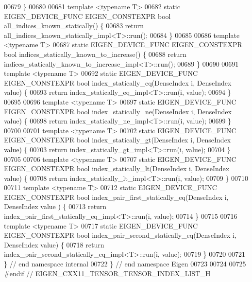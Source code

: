 \begin{DoxyCode}
00679 \}
00680 
00681 \textcolor{keyword}{template} <\textcolor{keyword}{typename} T>
00682 \textcolor{keyword}{static} EIGEN\_DEVICE\_FUNC EIGEN\_CONSTEXPR \textcolor{keywordtype}{bool} all\_indices\_known\_statically() \{
00683   \textcolor{keywordflow}{return} all\_indices\_known\_statically\_impl<T>::run();
00684 \}
00685 
00686 \textcolor{keyword}{template} <\textcolor{keyword}{typename} T>
00687 \textcolor{keyword}{static} EIGEN\_DEVICE\_FUNC EIGEN\_CONSTEXPR \textcolor{keywordtype}{bool} indices\_statically\_known\_to\_increase() \{
00688   \textcolor{keywordflow}{return} indices\_statically\_known\_to\_increase\_impl<T>::run();
00689 \}
00690 
00691 \textcolor{keyword}{template} <\textcolor{keyword}{typename} T>
00692 \textcolor{keyword}{static} EIGEN\_DEVICE\_FUNC EIGEN\_CONSTEXPR \textcolor{keywordtype}{bool} index\_statically\_eq(DenseIndex i, DenseIndex value) \{
00693   \textcolor{keywordflow}{return} index\_statically\_eq\_impl<T>::run(i, value);
00694 \}
00695 
00696 \textcolor{keyword}{template} <\textcolor{keyword}{typename} T>
00697 \textcolor{keyword}{static} EIGEN\_DEVICE\_FUNC EIGEN\_CONSTEXPR \textcolor{keywordtype}{bool} index\_statically\_ne(DenseIndex i, DenseIndex value) \{
00698   \textcolor{keywordflow}{return} index\_statically\_ne\_impl<T>::run(i, value);
00699 \}
00700 
00701 \textcolor{keyword}{template} <\textcolor{keyword}{typename} T>
00702 \textcolor{keyword}{static} EIGEN\_DEVICE\_FUNC EIGEN\_CONSTEXPR \textcolor{keywordtype}{bool} index\_statically\_gt(DenseIndex i, DenseIndex value) \{
00703   \textcolor{keywordflow}{return} index\_statically\_gt\_impl<T>::run(i, value);
00704 \}
00705 
00706 \textcolor{keyword}{template} <\textcolor{keyword}{typename} T>
00707 \textcolor{keyword}{static} EIGEN\_DEVICE\_FUNC EIGEN\_CONSTEXPR \textcolor{keywordtype}{bool} index\_statically\_lt(DenseIndex i, DenseIndex value) \{
00708   \textcolor{keywordflow}{return} index\_statically\_lt\_impl<T>::run(i, value);
00709 \}
00710 
00711 \textcolor{keyword}{template} <\textcolor{keyword}{typename} T>
00712 \textcolor{keyword}{static} EIGEN\_DEVICE\_FUNC EIGEN\_CONSTEXPR \textcolor{keywordtype}{bool} index\_pair\_first\_statically\_eq(DenseIndex i, DenseIndex value
      ) \{
00713   \textcolor{keywordflow}{return} index\_pair\_first\_statically\_eq\_impl<T>::run(i, value);
00714 \}
00715 
00716 \textcolor{keyword}{template} <\textcolor{keyword}{typename} T>
00717 \textcolor{keyword}{static} EIGEN\_DEVICE\_FUNC EIGEN\_CONSTEXPR \textcolor{keywordtype}{bool} index\_pair\_second\_statically\_eq(DenseIndex i, DenseIndex 
      value) \{
00718   \textcolor{keywordflow}{return} index\_pair\_second\_statically\_eq\_impl<T>::run(i, value);
00719 \}
00720 
00721 \}  \textcolor{comment}{// end namespace internal}
00722 \}  \textcolor{comment}{// end namespace Eigen}
00723 
00724 
00725 \textcolor{preprocessor}{#endif // EIGEN\_CXX11\_TENSOR\_TENSOR\_INDEX\_LIST\_H}
\end{DoxyCode}
